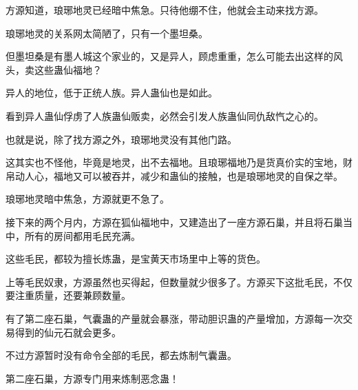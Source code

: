 \begin{this_body}
方源知道，琅琊地灵已经暗中焦急。只待他绷不住，他就会主动来找方源。

琅琊地灵的关系网太简陋了，只有一个墨坦桑。

但墨坦桑是有墨人城这个家业的，又是异人，顾虑重重，怎么可能去出这样的风头，卖这些蛊仙福地？

异人的地位，低于正统人族。异人蛊仙也是如此。

看到异人蛊仙俘虏了人族蛊仙贩卖，必然会引发人族蛊仙同仇敌忾之心的。

也就是说，除了找方源之外，琅琊地灵没有其他门路。

这其实也不怪他，毕竟是地灵，出不去福地。且琅琊福地乃是货真价实的宝地，财帛动人心，福地又可以被吞并，减少和蛊仙的接触，也是琅琊地灵的自保之举。

琅琊地灵暗中焦急，方源就更不急了。

接下来的两个月内，方源在狐仙福地中，又建造出了一座方源石巢，并且将石巢当中，所有的房间都用毛民充满。

这些毛民，都较为擅长炼蛊，是宝黄天市场里中上等的货色。

上等毛民奴隶，方源虽然也买得起，但数量就少很多了。方源买下这批毛民，不仅要注重质量，还要兼顾数量。

有了第二座石巢，气囊蛊的产量就会暴涨，带动胆识蛊的产量增加，方源每一次交易得到的仙元石就会更多。

不过方源暂时没有命令全部的毛民，都去炼制气囊蛊。

第二座石巢，方源专门用来炼制恶念蛊！

\end{this_body}

